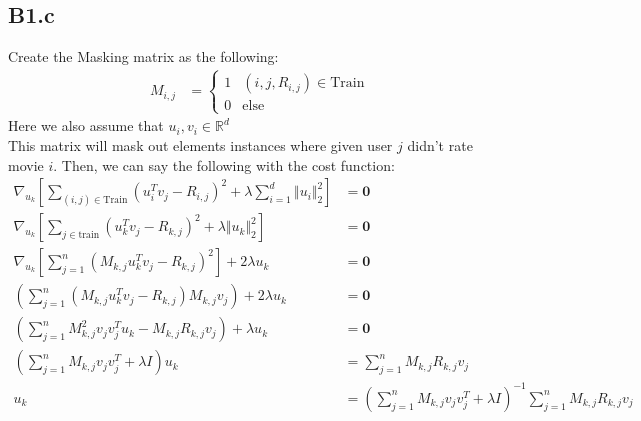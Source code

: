 \documentclass[]{article}
\begin{document}
    \subsection*{B1.c}
        Create the Masking matrix as the following: 
        \begin{align*}\tag{B1.c.1}\label{eqn:B1.c.1}
            M_{i, j} &= \begin{cases}
                1 & (i, j, R_{i, j}) \in \text{Train}
                \\
                0 & \text{else} 
            \end{cases}
        \end{align*}
        Here we also assume that $u_i, v_i \in \mathbb{R}^d$
        \\[1.1em]
        This matrix will mask out elements instances where given user $j$ didn't rate movie $i$. Then, we can say the following with the cost function: 
        \begin{align*}\tag{B1.c.2}\label{eqn:B1.c.2}
            \nabla_{u_k} \left[
                \sum_{(i, j)\in \text{Train}}^{}
                    (u_i^Tv_j - R_{i, j})^2
                +
                \lambda \sum_{i = 1}^{d}
                    \Vert u_i\Vert_2^2
            \right] &= \mathbf{0}
            \\
            \nabla_{u_k}\left[
                \sum_{j\in \text{train}}^{}
                    (u_k^T v_j - R_{k,j})^2
                +
                \lambda \Vert u_k\Vert_2^2
            \right] &= \mathbf{0}
            \\
            \nabla_{u_k} \left[
                \sum_{j = 1}^{n}
                    (M_{k, j}u_k^Tv_j - R_{k, j})^2
            \right] + 2\lambda u_k &= \mathbf{0}
            \\
            \left(
                \sum_{j = 1}^{n}
                    (M_{k, j}u_k^Tv_j - R_{k, j})M_{k, j}v_j
            \right) + 2\lambda u_k 
                &= \mathbf{0}
            \\
            \left(
                \sum_{j = 1}^{n} 
                M_{k, j}^2v_jv_j^Tu_k - M_{k, j}R_{k, j}v_j
            \right) + \lambda u_k 
            &= \mathbf{0}
            \\
            \left(
                \sum_{j = 1}^{n} 
                    M_{k, j}v_jv_j^T
                + \lambda I
            \right)u_k 
            &= \sum_{j = 1}^{n}M_{k,j}R_{k,j}v_j
            \\
            u_k &= \left(
                \sum_{j = 1}^{n} 
                    M_{k, j}v_jv_j^T
                + \lambda I
            \right)^{-1}\sum_{j = 1}^{n}M_{k,j}R_{k,j}v_j
        \end{align*}
\end{document}
